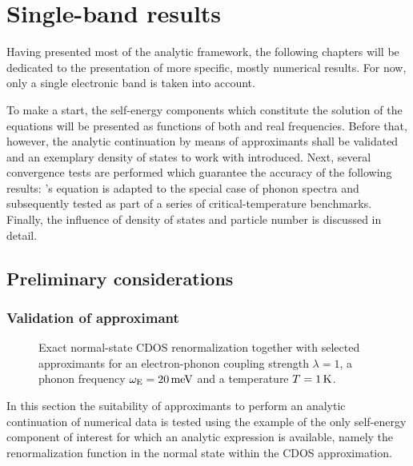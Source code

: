 
\chapter{Single-band results}

Having presented most of the analytic framework, the following chapters will be
dedicated to the presentation of more specific, mostly numerical results. For
now, only a single electronic band is taken into account.

To make a start, the self-energy components which constitute the solution of the
 equations will be presented as functions of both
 and real frequencies. Before that, however, the analytic
continuation by means of  approximants shall be validated and an
exemplary density of states to work with introduced. Next, several convergence
tests are performed which guarantee the accuracy of the following results:
's equation is adapted to the special case of 
phonon spectra and subsequently tested as part of a series of
critical-temperature benchmarks. Finally, the influence of density of states and
particle number is discussed in detail.

\section{Preliminary considerations}

\subsection{Validation of  approximant}

\begin{figure}
    
    
    \caption[Exact normal-state CDOS renormalization on both complex axes]{
        Exact normal-state CDOS renormalization together with selected
         approximants for an electron-phonon coupling strength
        $\lambda = 1$, a phonon frequency $\omega \sb{\text{E}} = 20\,\mathrm{meV}$ and a
        temperature $T = 1\,\mathrm K$.}
    \label{validation Pade}
\end{figure}
%
In this section the suitability of  approximants to perform an
analytic continuation of numerical data is tested using the example of the only
self-energy component of interest for which an analytic expression is available,
namely the renormalization function in the normal state within the CDOS
approximation.

